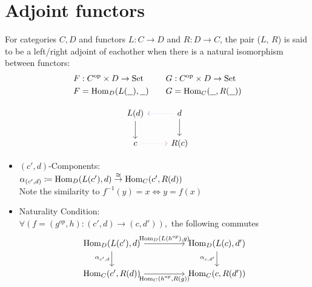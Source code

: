 \section{Adjoint functors}

\begin{definition}
  For categories $C, D$ and functors $L: C\to D$ and $R: D\to C$, the pair ($L$,
  $R$) is said to be a left/right adjoint of eachother when there is a natural
  isomorphism between functors: \parencite{fong_spivak:7sketches}
  \[
    \begin{aligned}
      F&: C^{\mathrm{op}} \times D \to \mathrm{Set}\\
      F&=\mathrm{Hom}_D(L(\underline{\ \ }), \underline{\ \ })
    \end{aligned}
    \qquad
    \begin{aligned}
      G&: C^{\mathrm{op}} \times D \to \mathrm{Set}\\
      G&=\mathrm{Hom}_C(\underline{\ \ }, R(\underline{\ \ }))
    \end{aligned}
  \]

  \[\begin{tikzcd}
    {L(d)} & d \\
    c & {R(c)}
    \arrow[from=1-2, to=2-2]
    \arrow[from=1-1, to=2-1]
    \arrow[draw={rgb,255:red,92;green,92;blue,214}, dotted, from=1-2, to=1-1]
    \arrow[draw={rgb,255:red,214;green,92;blue,92}, dotted, from=2-1, to=2-2]
  \end{tikzcd}\]

  \begin{itemize}
    \item $(c', d)$-Components:\\
      $\alpha_{(c', d)} \coloneqq \mathrm{Hom}_D(L(c'), d)
      \overset{\cong}{\to} \mathrm{Hom}_C(c', R(d))$\\
      Note the similarity to $f^{-1}(y)=x \iff y=f(x)$
    \item Naturality Condition:\\
      $\forall (f = (g^{op}, h): (c', d) \to (c, d')),$
      the following commutes
      \[\begin{tikzcd}
        {\Hom_D(L(c'), d)} && {\Hom_D(L(c),d')} \\
        {\Hom_C(c', R(d))} && {\Hom_C(c,R(d'))}
        \arrow["{\alpha_{c',d}}"', from=1-1, to=2-1]
        \arrow["{\alpha_{c,d'}}"', from=1-3, to=2-3]
        \arrow["{\Hom_D(L(h^{op}), g)}", from=1-1, to=1-3]
        \arrow["{\Hom_C(h^{op}, R(g))}"', from=2-1, to=2-3]
      \end{tikzcd}\]
  \end{itemize}
\end{definition}

